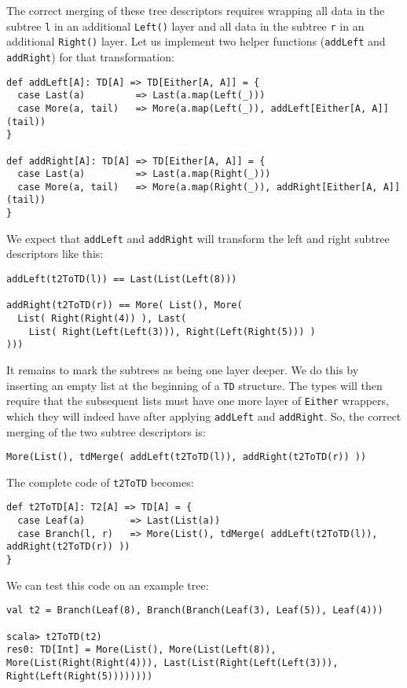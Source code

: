The correct merging of these tree descriptors requires wrapping all
data in the subtree \lstinline!l! in an additional \lstinline!Left()!
layer and all data in the subtree \lstinline!r! in an additional
\lstinline!Right()! layer. Let us implement two helper functions
(\lstinline!addLeft! and \lstinline!addRight!) for that transformation:
\begin{lstlisting}
def addLeft[A]: TD[A] => TD[Either[A, A]] = {
  case Last(a)         => Last(a.map(Left(_)))
  case More(a, tail)   => More(a.map(Left(_)), addLeft[Either[A, A]](tail))
}

def addRight[A]: TD[A] => TD[Either[A, A]] = {
  case Last(a)         => Last(a.map(Right(_)))
  case More(a, tail)   => More(a.map(Right(_)), addRight[Either[A, A]](tail))
}
\end{lstlisting}
 We expect that \lstinline!addLeft! and \lstinline!addRight! will
transform the left and right subtree descriptors like this:
\begin{lstlisting}
addLeft(t2ToTD(l)) == Last(List(Left(8)))

addRight(t2ToTD(r)) == More( List(), More(
  List( Right(Right(4)) ), Last(
    List( Right(Left(Left(3))), Right(Left(Right(5))) )
)))
\end{lstlisting}
It remains to mark the subtrees as being one layer deeper. We do this
by inserting an empty list at the beginning of a \lstinline!TD! structure.
The types will then require that the subsequent lists must have one
more layer of \lstinline!Either! wrappers, which they will indeed
have after applying \lstinline!addLeft! and \lstinline!addRight!.
So, the correct merging of the two subtree descriptors is:
\begin{lstlisting}
More(List(), tdMerge( addLeft(t2ToTD(l)), addRight(t2ToTD(r)) ))
\end{lstlisting}
The complete code of \lstinline!t2ToTD! becomes:
\begin{lstlisting}
def t2ToTD[A]: T2[A] => TD[A] = {
  case Leaf(a)        => Last(List(a))
  case Branch(l, r)   => More(List(), tdMerge( addLeft(t2ToTD(l)), addRight(t2ToTD(r)) ))
}
\end{lstlisting}
We can test this code on an example tree:
\begin{lstlisting}
val t2 = Branch(Leaf(8), Branch(Branch(Leaf(3), Leaf(5)), Leaf(4)))

scala> t2ToTD(t2)
res0: TD[Int] = More(List(), More(List(Left(8)), More(List(Right(Right(4))), Last(List(Right(Left(Left(3))), Right(Left(Right(5))))))))
\end{lstlisting}

